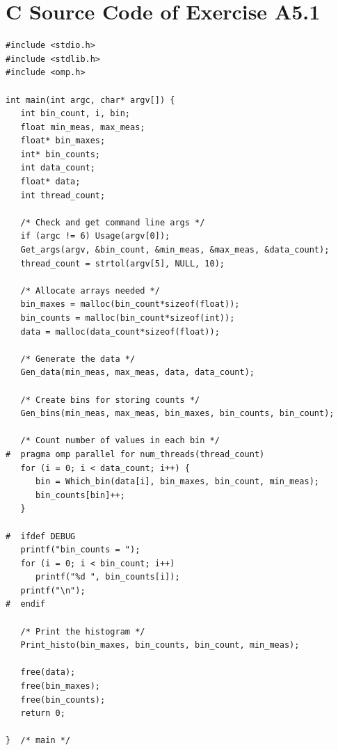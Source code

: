 \documentclass[a4paper,11pt,twoside]{article}
\begin{document}
\section{C Source Code of Exercise A5.1}{\label{app:histo}}

\begin{verbatim}
#include <stdio.h>
#include <stdlib.h>
#include <omp.h>

int main(int argc, char* argv[]) {
   int bin_count, i, bin;
   float min_meas, max_meas;
   float* bin_maxes;
   int* bin_counts;
   int data_count;
   float* data;
   int thread_count;

   /* Check and get command line args */
   if (argc != 6) Usage(argv[0]); 
   Get_args(argv, &bin_count, &min_meas, &max_meas, &data_count);
   thread_count = strtol(argv[5], NULL, 10);

   /* Allocate arrays needed */
   bin_maxes = malloc(bin_count*sizeof(float));
   bin_counts = malloc(bin_count*sizeof(int));
   data = malloc(data_count*sizeof(float));

   /* Generate the data */
   Gen_data(min_meas, max_meas, data, data_count);

   /* Create bins for storing counts */
   Gen_bins(min_meas, max_meas, bin_maxes, bin_counts, bin_count);

   /* Count number of values in each bin */
#  pragma omp parallel for num_threads(thread_count)
   for (i = 0; i < data_count; i++) {
      bin = Which_bin(data[i], bin_maxes, bin_count, min_meas);
      bin_counts[bin]++;
   }

#  ifdef DEBUG
   printf("bin_counts = ");
   for (i = 0; i < bin_count; i++)
      printf("%d ", bin_counts[i]);
   printf("\n");
#  endif

   /* Print the histogram */
   Print_histo(bin_maxes, bin_counts, bin_count, min_meas);

   free(data);
   free(bin_maxes);
   free(bin_counts);
   return 0;

}  /* main */
\end{verbatim}
\end{document}

